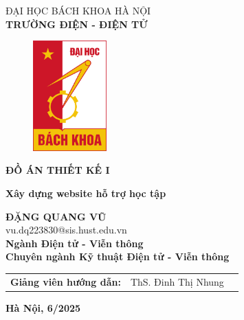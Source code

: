 \documentclass{article}
\begin{document}
	\cleardoublepage
	\thispagestyle{empty}
	\begin{center}
		\vspace{-12pt}  \fontsize{14pt}{0pt}\selectfont ĐẠI HỌC BÁCH KHOA HÀ NỘI \\[6pt]
		\textbf{\fontsize{16pt}{0pt}\selectfont TRƯỜNG ĐIỆN - ĐIỆN TỬ}
		\vspace{1.75cm}
		\begin{figure}[H]
			\centering
			\includegraphics[height=4.25cm]{logoHUST.png}
		\end{figure}
		\vspace{1cm}
		\textbf{\fontsize{25pt}{0pt}\selectfont ĐỒ ÁN THIẾT KẾ I} 
		\vspace{0.5cm}
	\end{center}
	\begin{center}
		\textbf{\fontsize{22pt}{0pt}\selectfont Xây dựng website hỗ trợ học tập} \\
		\vspace{2.5cm}
		
		\textbf{\fontsize{18pt}{0pt}\selectfont ĐẶNG QUANG VŨ} \\[6pt]
		\fontsize{16pt}{0pt}\selectfont vu.dq223830@sis.hust.edu.vn \\[6pt]
		\vspace{0.75cm}
		\textbf{\fontsize{16pt}{0pt}\selectfont Ngành Điện tử - Viễn thông} \\[6pt]
		\textbf{\fontsize{16pt}{0pt}\selectfont Chuyên ngành Kỹ thuật Điện tử - Viễn thông} 
		\vspace{0.75cm}
		\begin{table}[H]
			\centering
			\begin{tabular}{l l l}
				\fontsize{16pt}{0pt}\selectfont \textbf{Giảng viên hướng dẫn:}    & \fontsize{16pt}{0pt}\selectfont ThS. Đinh Thị Nhung \vspace{6pt} &  \\ 
			\end{tabular}
		\end{table}
		\vspace{2.5cm}
		\fontsize{14pt}{0pt}\selectfont \textbf{Hà Nội, 6/2025}
	\end{center}
	\cleardoublepage
\end{document}
